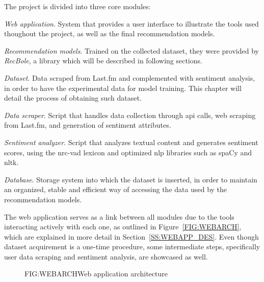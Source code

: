The project is divided into three core modules:

\begin{compactitem}[\textbullet]
    \item \emph{Web application}. System that provides a user interface to illustrate the tools used thoughout the project, as well as the final recommendation models.
    \begin{compactitem}[$\circ$]
        \item \emph{Recommendation models}. Trained on the collected dataset, they were provided by \emph{RecBole}, a library which will be described in following sections.
    \end{compactitem}
    \item \emph{Dataset}. Data scraped from Last.fm and complemented with sentiment analysis, in order to have the experimental data for model training. This chapter will detail the process of obtaining such dataset.
    \begin{compactitem}[$\circ$]
        \item \emph{Data scraper}. Script that handles data collection through \acs{api} calls, web scraping from Last.fm, and generation of sentiment attributes.
        \item \emph{Sentiment analyzer}. Script that analyzes textual content and generates sentiment scores, using the \acs{nrc}-\acs{vad} lexicon and optimized \acs{nlp} libraries such as spaCy and \acs{nltk}.
    \end{compactitem}
    \item \emph{Database}. Storage system into which the dataset is inserted, in order to maintain an organized, stable and efficient way of accessing the data used by the recommendation models.
\end{compactitem}

The web application serves as a link between all modules due to the tools interacting actively with each one, as outlined in Figure~\ref{FIG:WEBARCH}, which are explained in more detail in Section~\ref{SS:WEBAPP_DES}. Even though dataset acquirement is a one-time procedure, some intermediate steps, specifically user data scraping and sentiment analysis, are showcased as well.

\begin{figure}[Web application architecture]{FIG:WEBARCH}{Web application architecture}
\end{figure}